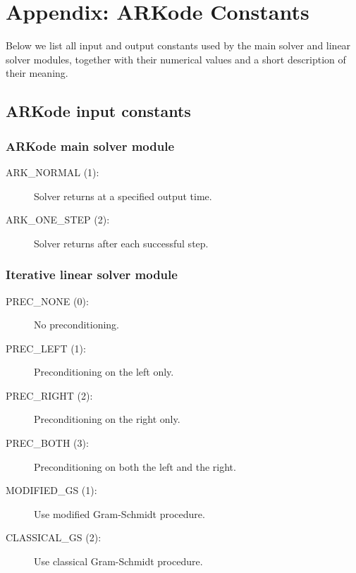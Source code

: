 \documentclass[letterpaper,10pt,english]{sphinxmanual}
\begin{document}
\chapter{Appendix: ARKode Constants}
\label{Constants:appendix-arkode-constants}\label{Constants::doc}\label{Constants:constants}
Below we list all input and output constants used by the main solver
and linear solver modules, together with their numerical values and a
short description of their meaning.


\section{ARKode input constants}
\label{Constants:arkode-input-constants}

\subsection{ARKode main solver module}
\label{Constants:arkode-main-solver-module}\begin{description}
\item[{ARK\_NORMAL (1):}] \leavevmode
Solver returns at a specified output time.

\item[{ARK\_ONE\_STEP  (2):}] \leavevmode
Solver returns after each successful step.

\end{description}


\subsection{Iterative linear solver module}
\label{Constants:iterative-linear-solver-module}\begin{description}
\item[{PREC\_NONE  (0):}] \leavevmode
No preconditioning.

\item[{PREC\_LEFT  (1):}] \leavevmode
Preconditioning on the left only.

\item[{PREC\_RIGHT  (2):}] \leavevmode
Preconditioning on the right only.

\item[{PREC\_BOTH  (3):}] \leavevmode
Preconditioning on both the left and the right.

\item[{MODIFIED\_GS  (1):}] \leavevmode
Use modified Gram-Schmidt procedure.

\item[{CLASSICAL\_GS  (2):}] \leavevmode
Use classical Gram-Schmidt procedure.

\end{description}
\end{document}
